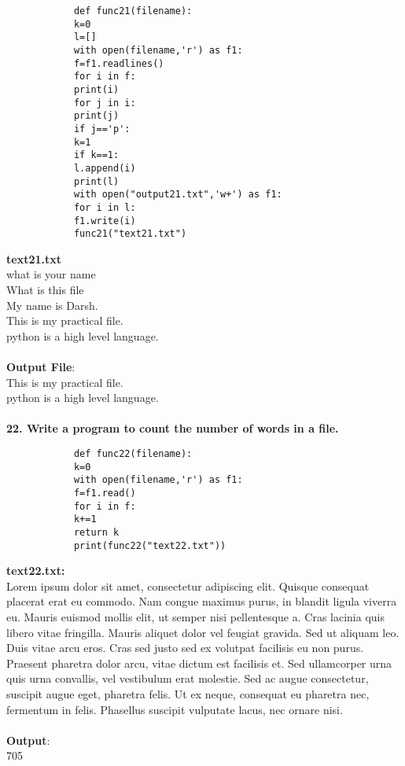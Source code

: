\documentclass[
a4paper]{article}
\begin{document}
\begin{large}
		\begin{verbatim}
			def func21(filename):
			k=0
			l=[]
			with open(filename,'r') as f1:
			f=f1.readlines()
			for i in f:
			print(i)
			for j in i:
			print(j)
			if j=='p':
			k=1
			if k==1:
			l.append(i)
			print(l)
			with open("output21.txt",'w+') as f1:
			for i in l:
			f1.write(i)
			func21("text21.txt")
		\end{verbatim}
		\textbf{text21.txt}\\
		what is your name\\
		What is this file\\
		My name is Darsh.\\
		This is my practical file.\\
		python is a high level language.\\
		\\
		\textbf{Output File}:\\
		This is my practical file.\\
		python is a high level language.\\
		\\\textbf{22. Write a program to count the number of words in a file.}
		\begin{verbatim}
			def func22(filename):
			k=0
			with open(filename,'r') as f1:
			f=f1.read()
			for i in f:
			k+=1
			return k
			print(func22("text22.txt"))
		\end{verbatim}
		\textbf{text22.txt:}\\
		Lorem ipsum dolor sit amet, consectetur adipiscing elit. Quisque consequat placerat erat eu commodo. Nam congue maximus purus, in blandit ligula viverra eu. Mauris euismod mollis elit, ut semper nisi pellentesque a. Cras lacinia quis libero vitae fringilla. Mauris aliquet dolor vel feugiat gravida. Sed ut aliquam leo. Duis vitae arcu eros. Cras sed justo sed ex volutpat facilisis eu non purus. Praesent pharetra dolor arcu, vitae dictum est facilisis et. Sed ullamcorper urna quis urna convallis, vel vestibulum erat molestie. Sed ac augue consectetur, suscipit augue eget, pharetra felis. Ut ex neque, consequat eu pharetra nec, fermentum in felis. Phasellus suscipit vulputate lacus, nec ornare nisi.\\
		\\
		\textbf{Output}:\\
		705\\
	\end{large}	
\end{document}
